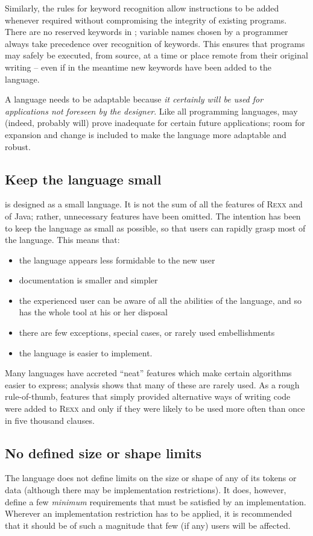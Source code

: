 Similarly, the rules for keyword recognition allow instructions to be added whenever required without compromising the integrity of existing programs. There are no reserved keywords in \nr{}; variable names chosen by a programmer always take precedence over recognition of keywords. This ensures that \nr{} programs may safely be executed, from source, at a time or place remote from their original writing – even if in the meantime new keywords have been added to the language.

A language needs to be adaptable because \emph{it certainly will be
  used for applications not foreseen by the designer}. Like all
programming languages, \nr{} may (indeed, probably will) prove
inadequate for certain future applications; room for expansion and
change is included to make the language more adaptable and robust.

\subsection{Keep the language small}
\nr{} is designed as a small language. It is not the sum of all the
features of R\textsc{exx} and of Java; rather, unnecessary features have been
omitted. The intention has been to keep the language as small as
possible, so that users can rapidly grasp most of the language. This
means that:
\begin{itemize}
\item the language appears less formidable to the new user
\item documentation is smaller and simpler
\item the experienced user can be aware of all the abilities of the
language, and so has the whole tool at his or her disposal
\item there are few exceptions, special cases, or rarely used embellishments
\item the language is easier to implement.
\end{itemize}
Many languages have accreted “neat” features which make certain
algorithms easier to express; analysis shows that many of these are
rarely used. As a rough rule-of-thumb, features that simply provided
alternative ways of writing code were added to R\textsc{exx} and \nr{} only
if they were likely to be used more often than once in five thousand
clauses.

\subsection{No defined size or shape limits}
The language does not define limits on the size or shape of any of its tokens or data (although there may be implementation restrictions). It does, however, define a few \emph{minimum} requirements that must be satisfied by an implementation. Wherever an implementation restriction has to be applied, it is recommended that it should be of such a magnitude that few (if any) users will be affected.


